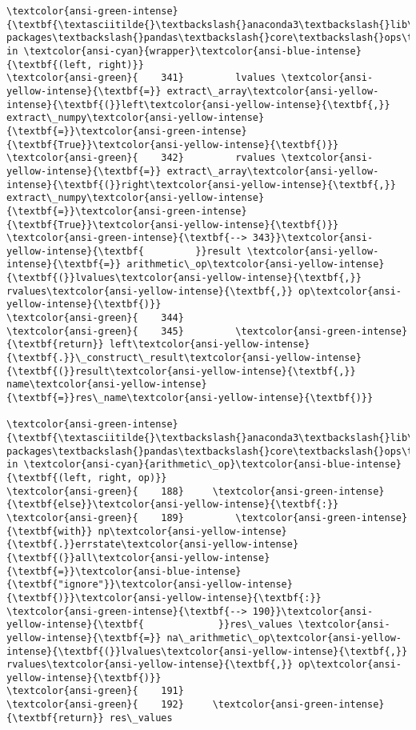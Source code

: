 \documentclass[11pt]{article}
\begin{document}
\begin{Verbatim}[commandchars=\\\{\}, frame=single, framerule=2mm, rulecolor=\color{outerrorbackground}]
\textcolor{ansi-green-intense}{\textbf{\textasciitilde{}\textbackslash{}anaconda3\textbackslash{}lib\textbackslash{}site-packages\textbackslash{}pandas\textbackslash{}core\textbackslash{}ops\textbackslash{}\_\_init\_\_.py}} in \textcolor{ansi-cyan}{wrapper}\textcolor{ansi-blue-intense}{\textbf{(left, right)}}
\textcolor{ansi-green}{    341}         lvalues \textcolor{ansi-yellow-intense}{\textbf{=}} extract\_array\textcolor{ansi-yellow-intense}{\textbf{(}}left\textcolor{ansi-yellow-intense}{\textbf{,}} extract\_numpy\textcolor{ansi-yellow-intense}{\textbf{=}}\textcolor{ansi-green-intense}{\textbf{True}}\textcolor{ansi-yellow-intense}{\textbf{)}}
\textcolor{ansi-green}{    342}         rvalues \textcolor{ansi-yellow-intense}{\textbf{=}} extract\_array\textcolor{ansi-yellow-intense}{\textbf{(}}right\textcolor{ansi-yellow-intense}{\textbf{,}} extract\_numpy\textcolor{ansi-yellow-intense}{\textbf{=}}\textcolor{ansi-green-intense}{\textbf{True}}\textcolor{ansi-yellow-intense}{\textbf{)}}
\textcolor{ansi-green-intense}{\textbf{--> 343}}\textcolor{ansi-yellow-intense}{\textbf{         }}result \textcolor{ansi-yellow-intense}{\textbf{=}} arithmetic\_op\textcolor{ansi-yellow-intense}{\textbf{(}}lvalues\textcolor{ansi-yellow-intense}{\textbf{,}} rvalues\textcolor{ansi-yellow-intense}{\textbf{,}} op\textcolor{ansi-yellow-intense}{\textbf{)}}
\textcolor{ansi-green}{    344} 
\textcolor{ansi-green}{    345}         \textcolor{ansi-green-intense}{\textbf{return}} left\textcolor{ansi-yellow-intense}{\textbf{.}}\_construct\_result\textcolor{ansi-yellow-intense}{\textbf{(}}result\textcolor{ansi-yellow-intense}{\textbf{,}} name\textcolor{ansi-yellow-intense}{\textbf{=}}res\_name\textcolor{ansi-yellow-intense}{\textbf{)}}

\textcolor{ansi-green-intense}{\textbf{\textasciitilde{}\textbackslash{}anaconda3\textbackslash{}lib\textbackslash{}site-packages\textbackslash{}pandas\textbackslash{}core\textbackslash{}ops\textbackslash{}array\_ops.py}} in \textcolor{ansi-cyan}{arithmetic\_op}\textcolor{ansi-blue-intense}{\textbf{(left, right, op)}}
\textcolor{ansi-green}{    188}     \textcolor{ansi-green-intense}{\textbf{else}}\textcolor{ansi-yellow-intense}{\textbf{:}}
\textcolor{ansi-green}{    189}         \textcolor{ansi-green-intense}{\textbf{with}} np\textcolor{ansi-yellow-intense}{\textbf{.}}errstate\textcolor{ansi-yellow-intense}{\textbf{(}}all\textcolor{ansi-yellow-intense}{\textbf{=}}\textcolor{ansi-blue-intense}{\textbf{"ignore"}}\textcolor{ansi-yellow-intense}{\textbf{)}}\textcolor{ansi-yellow-intense}{\textbf{:}}
\textcolor{ansi-green-intense}{\textbf{--> 190}}\textcolor{ansi-yellow-intense}{\textbf{             }}res\_values \textcolor{ansi-yellow-intense}{\textbf{=}} na\_arithmetic\_op\textcolor{ansi-yellow-intense}{\textbf{(}}lvalues\textcolor{ansi-yellow-intense}{\textbf{,}} rvalues\textcolor{ansi-yellow-intense}{\textbf{,}} op\textcolor{ansi-yellow-intense}{\textbf{)}}
\textcolor{ansi-green}{    191} 
\textcolor{ansi-green}{    192}     \textcolor{ansi-green-intense}{\textbf{return}} res\_values


\end{Verbatim}
\end{document}
